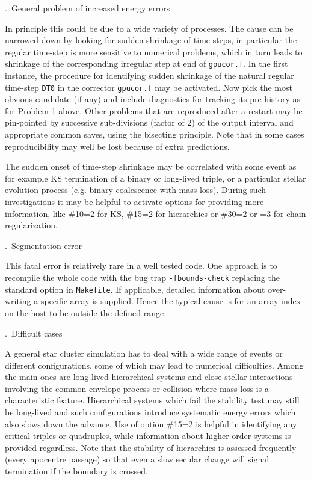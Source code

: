 \documentclass[12pt]{article}
\begin{document}
\bigskip
{}.~General problem of increased energy errors

\medskip
In principle this could be due to a wide variety of processes.
The cause can be narrowed down by looking for sudden shrinkage of time-steps, in
particular the regular time-step is more sensitive to numerical problems, which in turn
leads to shrinkage of the corresponding irregular step at end of {\tt gpucor.f}.
In the first instance, the procedure for identifying sudden shrinkage of the natural
regular time-step {\tt DT0} in the corrector {\tt gpucor.f} may be activated.
Now pick the most obvious candidate (if any) and include diagnostics for tracking
its pre-history as for Problem 1 above.
Other problems that are reproduced after a restart may be pin-pointed by successive
sub-divisions (factor of 2) of the output interval and appropriate common saves, using
the bisecting principle.
Note that in some cases reproducibility may well be lost because of extra predictions.

The sudden onset of time-step shrinkage may be correlated with some event as for
example KS termination of a binary or long-lived triple, or a particular stellar
evolution process (e.g. binary coalescence with mass loss).
During such investigations it may be helpful to activate options for providing more
information, like \#10=2 for KS, \#15=2 for hierarchies or \#30=2 or =3 for chain
regularization.

\bigskip
{}.~Segmentation error

\medskip
This fatal error is relatively rare in a well tested code.
One approach is to recompile the whole code with the bug trap {\tt -fbounds-check}
replacing the standard option in {\tt Makefile}.
If applicable, detailed information about over-writing a specific array is supplied.
Hence the typical cause is for an array index on the host to be outside the defined
range.

\bigskip
{}.~Difficult cases

\medskip
A general star cluster simulation has to deal with a wide range of events or different
configurations, some of which may lead to numerical difficulties.
Among the main ones are long-lived hierarchical systems and close stellar interactions
involving the common-envelope process or collision where mass-loss is a characteristic
feature.
Hierarchical systems which fail the stability test may still be long-lived and such
configurations introduce systematic energy errors which also slows down the advance.
Use of option \#15=2 is helpful in identifying any critical triples or quadruples, while
information about higher-order systems is provided regardless.
Note that the stability of hierarchies is assessed frequently (every apocentre passage)
so that even a slow secular change will signal termination if the boundary is crossed.
\end{document}
